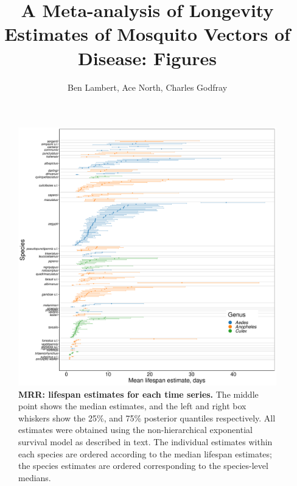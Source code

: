 \documentclass[12pt]{article}
\title{A Meta-analysis of Longevity Estimates of Mosquito Vectors of Disease: Figures}
\author{Ben Lambert, Ace North, Charles Godfray}
\begin{document}
\maketitle

\begin{figure}[h]
	\centerline{\includegraphics[width=1\textwidth]{./Figure_files/mrr_individualEstimates_allSpecies_withoutBalabacensis.pdf}}
	\caption{\textbf{MRR: lifespan estimates for each time series.} The middle point shows the median estimates, and the left and right box whiskers show the 25\%, and 75\% posterior quantiles respectively. All estimates were obtained using the non-hierarchical exponential survival model as described in text. The individual estimates within each species are ordered according to the median lifespan estimates; the species estimates are ordered corresponding to the species-level medians.}
	\label{fig:mrr_lifespan_individualEstimates}
\end{figure}
\end{document}
